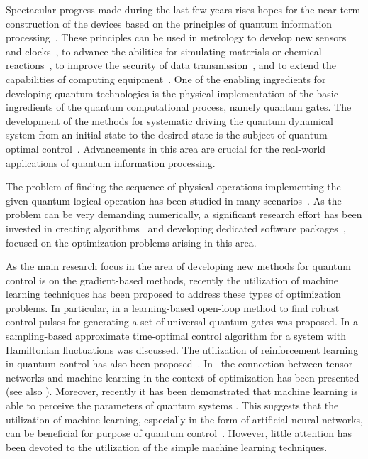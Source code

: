 \documentclass[aps,pra,showkeys,showpacs,notitlepage,superscriptaddress]{revtex4-1}
\newcommand{\1}{{\rm 1\hspace{-0.9mm}l}}
\begin{document}
Spectacular progress made during the last few years rises hopes for the near-term 
construction of the devices based on the principles of quantum information 
processing~\cite{Riedel2017, Acin2018}. These principles can be used in 
metrology to develop new sensors and clocks~\cite{Degen2017}, to advance the 
abilities for simulating materials or chemical reactions~\cite{Johnson2014}, to 
improve the security of data transmission~\cite{Benatti2010}, and to extend the 
capabilities of computing equipment~\cite{Hirvensalo2004, Soeken2018}. One of 
the enabling ingredients for developing quantum technologies is the physical 
implementation of the basic ingredients of the quantum computational process, 
namely quantum gates. The development of the methods for systematic driving the 
quantum dynamical system from an initial state to the desired state is the 
subject of quantum optimal control~\cite{dalessandro2007introduction, Brif2010, 
   	Glaser2015}. Advancements in this area are crucial for the real-world applications 
of quantum information processing.

The problem of finding the sequence of physical operations implementing the 
given quantum logical operation has been studied in many 
scenarios~\cite{heule2010local,Pawela2016,PhysRevLett.106.190501,khaneja2007shortest,PhysRevLett.114.200502}.
As the problem can be very demanding numerically, a significant research 
effort has been invested in creating 
algorithms~\cite{GRAPE,CRAB,oleg2018krotov} and developing dedicated software 
packages~\cite{DYNAMO,qutip2}, focused on the optimization problems arising in 
this area.

As the main research focus in the area of developing new methods for quantum 
control is on the gradient-based methods, recently the utilization of machine 
learning techniques has been proposed to address these types of optimization 
problems. In particular, in \cite{Wu2016} a learning-based open-loop method to 
find robust control pulses for generating a set of universal quantum gates was 
proposed. In \cite{Kuang2018} a sampling-based approximate time-optimal control 
algorithm for a system with Hamiltonian fluctuations was discussed. The 
utilization of reinforcement learning in quantum control has also been 
proposed~\cite{DaoyiDong2008,ChunlinChen2013,fosel2018reinforcement,vedaie2018reinforcement,bukov2018reinforcement,niu2019universal}.
In~\cite{augustlehrstuhl} the connection 
between tensor networks and machine learning in the context of optimization has 
been presented (see also \cite{august2017using,august2018taking}).
Moreover, recently it has been demonstrated that machine learning is able to 
perceive the parameters of quantum systems \cite{iten2018discovering}. This 
suggests that the utilization of machine learning, especially in the form of 
artificial neural networks, can be beneficial for purpose of quantum 
control~\cite{Dunjko_2018}. However, little attention has been devoted to the
utilization of the simple machine learning techniques. 
\end{document}
